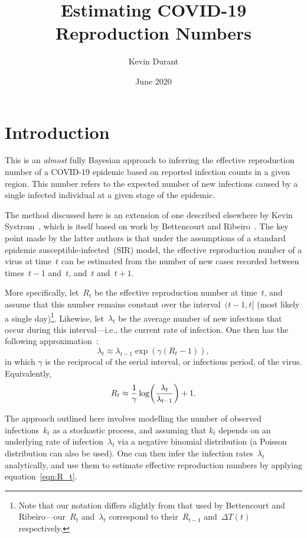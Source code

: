 \documentclass[12pt,a4paper]{article}
\title{Estimating COVID-19 Reproduction Numbers}
\author{Kevin Durant}
\date{June 2020}
\DeclarePairedDelimiter\lr{\lparen}{\rparen}  %
\begin{document}
\maketitle

\section{Introduction} %

This is an \emph{almost} fully Bayesian approach to inferring the effective
reproduction number of a COVID-19 epidemic based on reported infection counts in
a given region. This number refers to the expected number of new infections
caused by a single infected individual at a given stage of the epidemic.

The method discussed here is an extension of one described elsewhere by Kevin
Systrom~\cite{systrom2020}, which is itself based on work by Bettencourt and
Ribeiro~\cite{bettencourt2008}. The key point made by the latter authors is that
under the assumptions of a standard epidemic susceptible-infected~(SIR) model,
the effective reproduction number of a virus at time~$t$ can be estimated from
the number of new cases recorded between times~$t-1$ and~$t$, and~$t$ and~$t+1$.

More specifically, let~$R_t$ be the effective reproduction number at time~$t$,
and assume that this number remains constant over the interval~$(t-1, t]$ (most
likely a single day)\footnote{Note that our notation differs slightly from that
used by Bettencourt and Ribeiro---our~$R_t$ and~$\lambda_t$ correspond to
their~$R_{t-1}$ and~$\Delta T(t)$ respectively.}. Likewise, let~$\lambda_t$ be
the average number of new infections that occur during this interval---i.e., the
current rate of infection. One then has the following
approximation~\cite{bettencourt2008}:
\begin{equation*}
  \lambda_t \approx \lambda_{t-1}\exp(\gamma(R_t - 1)),
\end{equation*}
in which $\gamma$ is the reciprocal of the serial interval, or infectious
period, of the virus. Equivalently,
\begin{equation*}\label{eqn:R_t}
  R_t \approx \frac{1}{\gamma} \log\lr*{\frac{\lambda_t}{\lambda_{t-1}}} + 1.
\end{equation*}

The approach outlined here involves modelling the number of observed
infections~$k_t$ as a stochastic process, and assuming that $k_t$ depends on an
underlying rate of infection~$\lambda_t$ via a negative binomial distribution (a
Poisson distribution can also be used). One can then infer the infection
rates~$\lambda_t$ analytically, and use them to estimate effective reproduction
numbers by applying equation~\eqref{eqn:R_t}.
\end{document}
